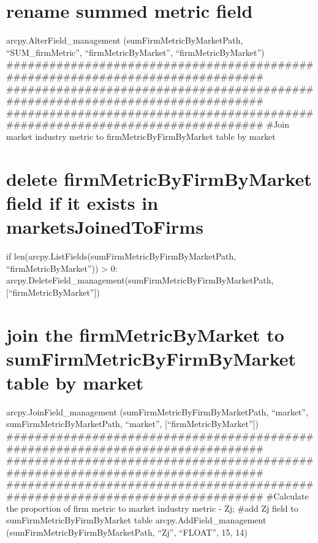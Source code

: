 \documentclass[]{article}
\begin{document}
\section{rename summed metric field}\label{rename-summed-metric-field-1}

arcpy.AlterField\_management (sumFirmMetricByMarketPath,
``SUM\_firmMetric'', ``firmMetricByMarket'', ``firmMetricByMarket'')
\#\#\#\#\#\#\#\#\#\#\#\#\#\#\#\#\#\#\#\#\#\#\#\#\#\#\#\#\#\#\#\#\#\#\#\#\#\#\#\#\#\#\#\#\#\#\#\#\#\#\#\#\#\#\#\#\#\#\#\#\#\#\#\#\#\#\#\#\#\#\#\#\#\#\#\#\#\#\#
\#\#\#\#\#\#\#\#\#\#\#\#\#\#\#\#\#\#\#\#\#\#\#\#\#\#\#\#\#\#\#\#\#\#\#\#\#\#\#\#\#\#\#\#\#\#\#\#\#\#\#\#\#\#\#\#\#\#\#\#\#\#\#\#\#\#\#\#\#\#\#\#\#\#\#\#\#\#\#
\#\#\#\#\#\#\#\#\#\#\#\#\#\#\#\#\#\#\#\#\#\#\#\#\#\#\#\#\#\#\#\#\#\#\#\#\#\#\#\#\#\#\#\#\#\#\#\#\#\#\#\#\#\#\#\#\#\#\#\#\#\#\#\#\#\#\#\#\#\#\#\#\#\#\#\#\#\#\#
\#Join market industry metric to firmMetricByFirmByMarket table by
market

\section{delete firmMetricByFirmByMarket field if it exists in
marketsJoinedToFirms}\label{delete-firmmetricbyfirmbymarket-field-if-it-exists-in-marketsjoinedtofirms}

if len(arcpy.ListFields(sumFirmMetricByFirmByMarketPath,
``firmMetricByMarket'')) \textgreater{} 0:
arcpy.DeleteField\_management(sumFirmMetricByFirmByMarketPath,{[}``firmMetricByMarket''{]})

\section{join the firmMetricByMarket to sumFirmMetricByFirmByMarket
table by
market}\label{join-the-firmmetricbymarket-to-sumfirmmetricbyfirmbymarket-table-by-market}

arcpy.JoinField\_management (sumFirmMetricByFirmByMarketPath,
``market'', sumFirmMetricByMarketPath, ``market'',
{[}``firmMetricByMarket''{]})
\#\#\#\#\#\#\#\#\#\#\#\#\#\#\#\#\#\#\#\#\#\#\#\#\#\#\#\#\#\#\#\#\#\#\#\#\#\#\#\#\#\#\#\#\#\#\#\#\#\#\#\#\#\#\#\#\#\#\#\#\#\#\#\#\#\#\#\#\#\#\#\#\#\#\#\#\#\#\#
\#\#\#\#\#\#\#\#\#\#\#\#\#\#\#\#\#\#\#\#\#\#\#\#\#\#\#\#\#\#\#\#\#\#\#\#\#\#\#\#\#\#\#\#\#\#\#\#\#\#\#\#\#\#\#\#\#\#\#\#\#\#\#\#\#\#\#\#\#\#\#\#\#\#\#\#\#\#\#
\#\#\#\#\#\#\#\#\#\#\#\#\#\#\#\#\#\#\#\#\#\#\#\#\#\#\#\#\#\#\#\#\#\#\#\#\#\#\#\#\#\#\#\#\#\#\#\#\#\#\#\#\#\#\#\#\#\#\#\#\#\#\#\#\#\#\#\#\#\#\#\#\#\#\#\#\#\#\#
\#Calculate the proportion of firm metric to market industry metric -
Zj; \#add Zj field to sumFirmMetricByFirmByMarket table
arcpy.AddField\_management (sumFirmMetricByFirmByMarketPath, ``Zj'',
``FLOAT'', 15, 14)
\end{document}
